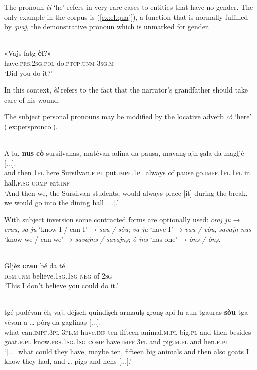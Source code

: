 The pronoun \textit{èl} `he' refers in very rare cases to entities that have no gender. The only example in the corpus is (\ref{ex:el.quaj}), a function that is normally fulfilled by \textit{quaj}, the demonstrative pronoun which is unmarked for gender.

\ea
\label{ex:el.quaj}
\\
\gll «Vajs fatg \textbf{èl}?»\\
have.\textsc{prs.2sg.pol} do.\textsc{ptcp.unm} \textsc{3sg.m}\\
\glt `Did you do it?'
\z

In this context, \textit{èl} refers to the fact that the narrator's grandfather should take care of his wound.

The subject personal pronouns may be modified by the locative adverb \textit{cò} `here' (\ref{ex:perspronco}).

\ea
\label{ex:perspronco}
\\
\gll A lu, \textbf{nus} \textbf{cò} sursilvanas, matévan adina da pausa, mavanṣ ajn ṣala da magljè [...].\\
and then \textsc{1pl} here Sursilvan.\textsc{f.pl} put.\textsc{impf.1pl} always of pause go.\textsc{impf.1pl.1pl} in hall.\textsc{f.sg} \textsc{comp} eat.\textsc{inf}\\
\glt `And then we, the Sursilvan students, would always place [it] during the break, we would go into the dining hall [...].'
\z

With subject inversion some contracted forms are optionally used: \textit{craj ju} → \textit{crau}, \textit{sa ju} `know I / can I' → \textit{sau / sòu}; \textit{va ju} `have I' → \textit{vau / vòu}, \textit{savajn nus} `know we / can we' → \textit{savajns / savajnṣ}; \textit{ò ins} `has one' → \textit{òns / ònṣ}.

\ea
\label{}
\\
\gll Gljèz \textbf{crau} bé da té.\\
\textsc{dem.unm} believe.\textsc{1sg.1sg} \textsc{neg} of \textsc{2sg}\\
\glt `This I don't believe you could do it.'
\z

\ea
\label{}
\\
\gll   [...] tgé pudévan èlṣ vaj, déjsch quindiṣch armaulṣ gronṣ api lu aun tgauras \textbf{sòu} tga vèvan a … pòrṣ da gaglinaṣ [...]. \\
{} what can.\textsc{impf.3pl} \textsc{3pl.m} have.\textsc{inf} ten fifteen animal.\textsc{m.pl} big.\textsc{pl} and then besides goat.\textsc{f.pl} know.\textsc{prs.1sg.1sg} \textsc{comp} have.\textsc{impf.3pl} and pig.\textsc{m.pl} and hen.\textsc{f.pl}\\
\glt `[...] what could they have, maybe ten, fifteen big animals and then also goats I know they had, and … pigs and hens [...].'
\z

